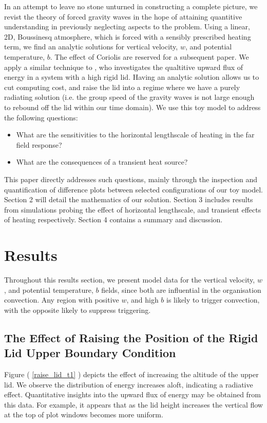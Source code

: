 \documentclass[a4paper,10pt]{article}
\begin{document}
In an attempt to leave no stone unturned in constructing a complete picture, we revist the theory
of forced gravity waves in the hope of attaining quantitive understanding in previously
neglecting aspects to the problem. Using a linear, 2D, Boussinesq atmosphere, which is forced with
a sensibly prescribed heating term, we find an analytic solutions for vertical velocity, $w$, and
potential temperature, $b$. The effect of Coriolis are reserved for a subsequent paper. We apply a
similar technique to \citep{nicholls1991thermally}, who investigates the qualtitive upward flux of
energy in a system with a high rigid lid. Having an analytic solution allows us to cut computing
cost, and raise the lid into a regime where we have a purely radiating solution (i.e. the group
speed of the gravity waves is not large enough to rebound off the lid within our time domain). We
use this toy model to address the following questions:
\begin{itemize}
 \item What are the sensitivities to the horizontal lengthscale of heating in the far field
response?
 \item What are the consequences of a transient heat source? 
\end{itemize}
This paper directly addresses such questions, mainly through the inspection and quantification of
difference plots between selected configurations of our toy model. Section 2 will detail the
mathematics of our solution. Section 3 includes results from simulations probing the effect of
horizontal lengthscale, and transient effects of heating respectively. Section 4 contains a
summary and discussion. 

\pagebreak
\section{Results}
Throughout this results section, we present model data for the vertical velocity, $w$,  and
potential temperature, $b$ fields, since both are influential in the organisation convection. Any
region with positive $w$, and high $b$ is likely to trigger convection, with the opposite likely to
suppress triggering.

\subsection{The Effect of Raising the Position of the Rigid Lid Upper Boundary Condition}
Figure ( \ref{raise_lid_t1} ) depicts the effect of increasing the
altitude of the upper lid. We observe the distribution of energy increases aloft, indicating a
radiative effect. Quantitative insights into the upward flux of energy may be obtained from this
data. For example, it appears that as the lid height increases the vertical flow at the top of plot
windows becomes more uniform.
\end{document}

